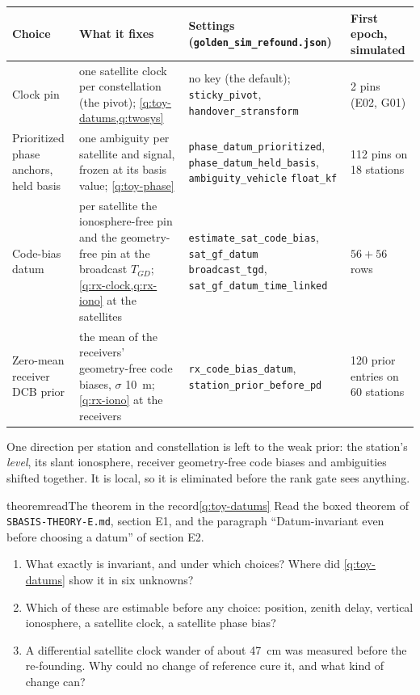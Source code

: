 \begin{center}\footnotesize
\begin{tabular}{@{}p{2.6cm}p{4.1cm}p{4.6cm}p{2.9cm}@{}}
\toprule
Choice & What it fixes & Settings (\texttt{golden\_sim\_refound.json}) & First epoch, simulated \\
\midrule
Clock pin & one satellite clock per constellation (the pivot); \cref{q:toy-datums,q:twosys} & no key (the default); \texttt{sticky\_pivot}, \texttt{handover\_stransform} & 2 pins (E02, G01) \\
Prioritized phase anchors, held basis & one ambiguity per satellite and signal, frozen at its basis value; \cref{q:toy-phase} & \texttt{phase\_datum\_prioritized}, \texttt{phase\_datum\_held\_basis}, \texttt{ambiguity\_vehicle} \texttt{float\_kf} & 112 pins on 18 stations \\
Code-bias datum & per satellite the ionosphere-free pin and the geometry-free pin at the broadcast $T_{GD}$; \cref{q:rx-clock,q:rx-iono} at the satellites & \texttt{estimate\_sat\_code\_bias}, \texttt{sat\_gf\_datum} \texttt{broadcast\_tgd}, \texttt{sat\_gf\_datum\_time\_linked} & $56 + 56$ rows \\
Zero-mean receiver DCB prior & the mean of the receivers' geometry-free code biases, $\sigma$ 10~m; \cref{q:rx-iono} at the receivers & \texttt{rx\_code\_bias\_datum}, \texttt{station\_prior\_before\_pd} & 120 prior entries on 60 stations \\
\bottomrule
\end{tabular}
\end{center}

One direction per station and constellation is left to the weak prior: the
station's \emph{level}, its slant ionosphere, receiver geometry-free code biases
and ambiguities shifted together. It is local, so it is eliminated before the
rank gate sees anything.

\begin{question}{theorem}{read}{The theorem in the record}{\ref{q:toy-datums}}
Read the boxed theorem of \texttt{SBASIS-THEORY-E.md}, section E1, and the
paragraph ``Datum-invariant even before choosing a datum'' of section E2.
\begin{enumerate}[leftmargin=*, itemsep=1pt]
\item What exactly is invariant, and under which choices? Where did
      \cref{q:toy-datums} show it in six unknowns?
\item Which of these are estimable before any choice: position, zenith delay,
      vertical ionosphere, a satellite clock, a satellite phase bias?
\item A differential satellite clock wander of about 47~cm was measured before
      the re-founding. Why could no change of reference cure it, and what kind of
      change can?
\end{enumerate}
\end{question}

